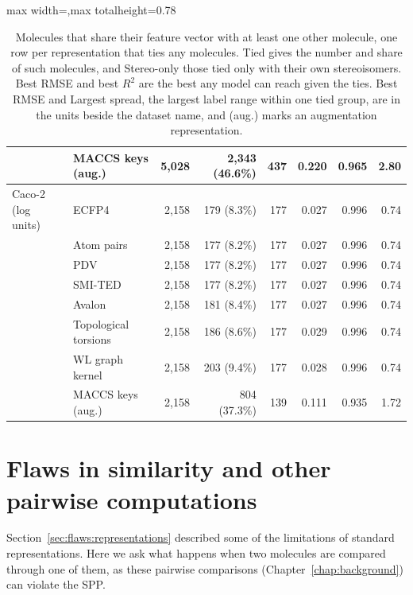 \begin{table}[htbp]
\begin{adjustbox}{max width=\textwidth,max totalheight=0.78\textheight}
\begin{tabular}{llrrrrrr}
 & MACCS keys (aug.) & 5,028 & 2,343 (46.6\%) & 437 & 0.220 & 0.965 & 2.80 \\
\midrule
Caco-2 (log units) & ECFP4 & 2,158 & 179 (8.3\%) & 177 & 0.027 & 0.996 & 0.74 \\
 & Atom pairs & 2,158 & 177 (8.2\%) & 177 & 0.027 & 0.996 & 0.74 \\
 & PDV & 2,158 & 177 (8.2\%) & 177 & 0.027 & 0.996 & 0.74 \\
 & SMI-TED & 2,158 & 177 (8.2\%) & 177 & 0.027 & 0.996 & 0.74 \\
 & Avalon & 2,158 & 181 (8.4\%) & 177 & 0.027 & 0.996 & 0.74 \\
 & Topological torsions & 2,158 & 186 (8.6\%) & 177 & 0.029 & 0.996 & 0.74 \\
 & WL graph kernel & 2,158 & 203 (9.4\%) & 177 & 0.028 & 0.996 & 0.74 \\
 & MACCS keys (aug.) & 2,158 & 804 (37.3\%) & 139 & 0.111 & 0.935 & 1.72 \\
\bottomrule
\end{tabular}
\end{adjustbox}
\caption[Molecules that share a feature vector with another molecule.]{Molecules that share their feature vector with at least one other molecule, one row per representation that ties any molecules. Tied gives the number and share of such molecules, and Stereo-only those tied only with their own stereoisomers. Best RMSE and best $R^2$ are the best any model can reach given the ties. Best RMSE and Largest spread, the largest label range within one tied group, are in the units beside the dataset name, and (aug.) marks an augmentation representation.}
\label{tab:flaws:ties}
\end{table}



\section{Flaws in similarity and other pairwise computations}\label{sec:flaws:similarity} 

Section~\ref{sec:flaws:representations} described some of the limitations of standard representations. Here we ask what happens when two molecules are compared through one of them, as these pairwise comparisons (Chapter~\ref{chap:background}) can violate the SPP.


